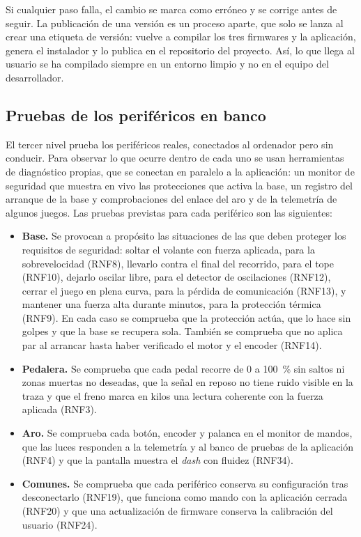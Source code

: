Si cualquier paso falla, el cambio se marca como erróneo y se corrige antes de seguir. La publicación de una versión es un proceso aparte, que solo se lanza al crear una etiqueta de versión: vuelve a compilar los tres firmwares y la aplicación, genera el instalador y lo publica en el repositorio del proyecto. Así, lo que llega al usuario se ha compilado siempre en un entorno limpio y no en el equipo del desarrollador.

\subsection{Pruebas de los periféricos en banco}
\label{subsec:pruebas-banco}
El tercer nivel prueba los periféricos reales, conectados al ordenador pero sin conducir. Para observar lo que ocurre dentro de cada uno se usan herramientas de diagnóstico propias, que se conectan en paralelo a la aplicación: un monitor de seguridad que muestra en vivo las protecciones que activa la base, un registro del arranque de la base y comprobaciones del enlace del aro y de la telemetría de algunos juegos. Las pruebas previstas para cada periférico son las siguientes:

\begin{itemize}
	\item \textbf{Base.} Se provocan a propósito las situaciones de las que deben proteger los requisitos de seguridad: soltar el volante con fuerza aplicada, para la sobrevelocidad (RNF8), llevarlo contra el final del recorrido, para el tope (RNF10), dejarlo oscilar libre, para el detector de oscilaciones (RNF12), cerrar el juego en plena curva, para la pérdida de comunicación (RNF13), y mantener una fuerza alta durante minutos, para la protección térmica (RNF9). En cada caso se comprueba que la protección actúa, que lo hace sin golpes y que la base se recupera sola. También se comprueba que no aplica par al arrancar hasta haber verificado el motor y el encoder (RNF14).
	\item \textbf{Pedalera.} Se comprueba que cada pedal recorre de 0 a 100~\% sin saltos ni zonas muertas no deseadas, que la señal en reposo no tiene ruido visible en la traza y que el freno marca en kilos una lectura coherente con la fuerza aplicada (RNF3).
	\item \textbf{Aro.} Se comprueba cada botón, encoder y palanca en el monitor de mandos, que las luces responden a la telemetría y al banco de pruebas de la aplicación (RNF4) y que la pantalla muestra el \textit{dash} con fluidez (RNF34).
	\item \textbf{Comunes.} Se comprueba que cada periférico conserva su configuración tras desconectarlo (RNF19), que funciona como mando con la aplicación cerrada (RNF20) y que una actualización de firmware conserva la calibración del usuario (RNF24).
\end{itemize}

